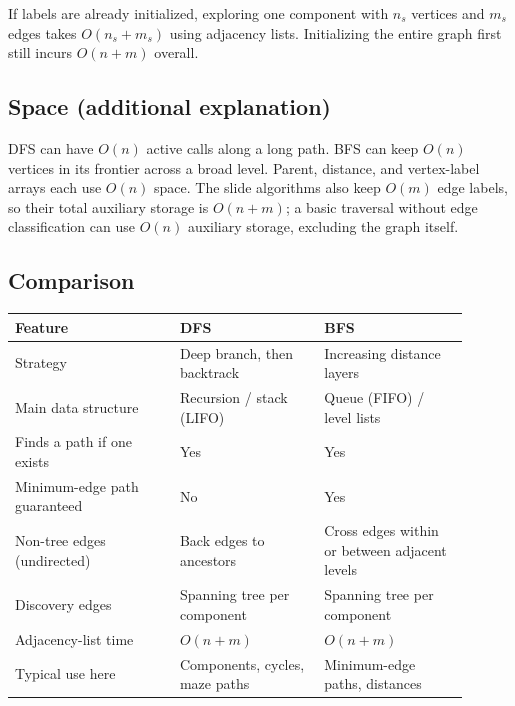 \documentclass[11pt,letterpaper]{article}
\begin{document}
If labels are already initialized, exploring one component with $n_s$ vertices and $m_s$ edges takes $O(n_s+m_s)$ using adjacency lists. Initializing the entire graph first still incurs $O(n+m)$ overall.

\subsection{Space (additional explanation)}
DFS can have $O(n)$ active calls along a long path. BFS can keep $O(n)$ vertices in its frontier across a broad level. Parent, distance, and vertex-label arrays each use $O(n)$ space. The slide algorithms also keep $O(m)$ edge labels, so their total auxiliary storage is $O(n+m)$; a basic traversal without edge classification can use $O(n)$ auxiliary storage, excluding the graph itself.

\subsection{Comparison}
\begin{center}
\small
\begin{tabular}{p{0.32\linewidth}p{0.29\linewidth}p{0.29\linewidth}}
\toprule
Feature & DFS & BFS \\
\midrule
Strategy & Deep branch, then backtrack & Increasing distance layers \\
Main data structure & Recursion / stack (LIFO) & Queue (FIFO) / level lists \\
Finds a path if one exists & Yes & Yes \\
Minimum-edge path guaranteed & No & Yes \\
Non-tree edges (undirected) & Back edges to ancestors & Cross edges within or between adjacent levels \\
Discovery edges & Spanning tree per component & Spanning tree per component \\
Adjacency-list time & $O(n+m)$ & $O(n+m)$ \\
Typical use here & Components, cycles, maze paths & Minimum-edge paths, distances \\
\bottomrule
\end{tabular}
\end{center}

\clearpage
\end{document}
